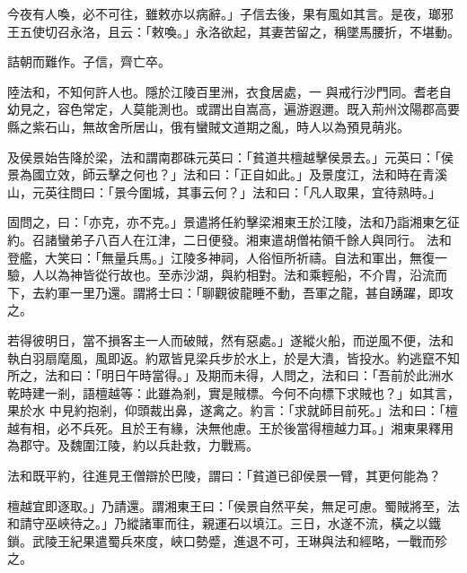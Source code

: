 \begin{pinyinscope}
 今夜有人喚，必不可往，雖敕亦以病辭。」子信去後，果有風如其言。是夜，瑯邪王五使切召永洛，且云：「敕喚。」永洛欲起，其妻苦留之，稱墜馬腰折，不堪動。



 詰朝而難作。子信，齊亡卒。



 陸法和，不知何許人也。隱於江陵百里洲，衣食居處，一
 與戒行沙門同。耆老自幼見之，容色常定，人莫能測也。或謂出自嵩高，遍游遐邇。既入荊州汶陽郡高要縣之紫石山，無故舍所居山，俄有蠻賊文道期之亂，時人以為預見萌兆。



 及侯景始告降於梁，法和謂南郡硃元英曰：「貧道共檀越擊侯景去。」元英曰：「侯景為國立效，師云擊之何也？」法和曰：「正自如此。」及景度江，法和時在青溪山，元英往問曰：「景今圍城，其事云何？」法和曰：「凡人取果，宜待熟時。」



 固問之，曰：「亦克，亦不克。」景遣將任約擊梁湘東王於江陵，法和乃詣湘東乞征約。召諸蠻弟子八百人在江津，二日便發。湘東遣胡僧祐領千餘人與同行。
 法和
 登艦，大笑曰：「無量兵馬。」江陵多神祠，人俗恒所祈禱。自法和軍出，無復一驗，人以為神皆從行故也。至赤沙湖，與約相對。法和乘輕船，不介胄，沿流而下，去約軍一里乃還。謂將士曰：「聊觀彼龍睡不動，吾軍之龍，甚自踴躍，即攻之。



 若得彼明日，當不損客主一人而破賊，然有惡處。」遂縱火船，而逆風不便，法和執白羽扇麾風，風即返。約眾皆見梁兵步於水上，於是大潰，皆投水。約逃竄不知所之，法和曰：「明日午時當得。」及期而未得，人問之，法和曰：「吾前於此洲水乾時建一剎，語檀越等：此雖為剎，實是賊標。今何不向標下求賊也？」如其言，果於水
 中見約抱剎，仰頭裁出鼻，遂禽之。約言：「求就師目前死。」法和曰：「檀越有相，必不兵死。且於王有緣，決無他慮。王於後當得檀越力耳。」湘東果釋用為郡守。及魏圍江陵，約以兵赴救，力戰焉。



 法和既平約，往進見王僧辯於巴陵，謂曰：「貧道已卻侯景一臂，其更何能為？



 檀越宜即逐取。」乃請還。謂湘東王曰：「侯景自然平矣，無足可慮。蜀賊將至，法和請守巫峽待之。」乃縱諸軍而往，親運石以填江。三日，水遂不流，橫之以鐵鎖。武陵王紀果遣蜀兵來度，峽口勢蹙，進退不可，王琳與法和經略，一戰而殄之。




\end{pinyinscope}
